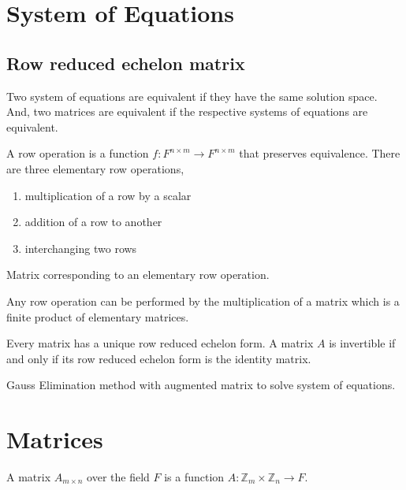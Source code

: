 \section{System of Equations}
\subsection{Row reduced echelon matrix}
\begin{definition}[equivalent]
	Two system of equations are equivalent if they have the same solution space.
	And, two matrices are equivalent if the respective systems of equations are equivalent.
\end{definition}

\begin{definition}
	A row operation is a function $f : F^{n \times m} \to F^{n \times m}$ that preserves equivalence.
	There are three elementary row operations,
	\begin{enumerate}
		\item multiplication of a row by a scalar
		\item addition of a row to another
		\item interchanging two rows
	\end{enumerate}
\end{definition}

\begin{definition}
	Matrix corresponding to an elementary row operation.
\end{definition}
\begin{note}
	Any row operation can be performed by the multiplication of a matrix which is a finite product of elementary matrices.
\end{note}

\begin{note}
	Every matrix has a unique row reduced echelon form.
	A matrix $A$ is invertible if and only if its row reduced echelon form is the identity matrix.
\end{note}

\begin{note}
	Gauss Elimination method with augmented matrix to solve system of equations.
\end{note}

\section{Matrices}
\begin{definition}[matrix]
	A matrix $A_{m \times n}$ over the field $F$ is a function $A : \mathbb{Z}_m \times \mathbb{Z}_n \to F$.
\end{definition}

